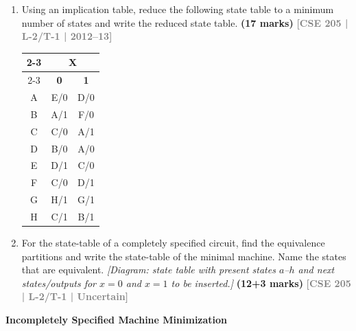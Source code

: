 \documentclass[12pt,a3paper]{article}
\newcommand{\yr}[1]{\hfill\textcolor{gray}{\small\textbf{[#1]}}}
\newcommand{\mk}[1]{\textcolor{orange!70!black}{\small\textbf{(#1 marks)}}}
\newcommand{\subtopic}[2]{%
  \vspace{10pt}
  \noindent\begin{tcolorbox}[colback=#1!8,colframe=#1,boxrule=0.6pt,arc=4pt,
    left=6pt,right=6pt,top=4pt,bottom=4pt]
    \small\bfseries\textcolor{#1}{#2}
  \end{tcolorbox}
  \vspace{2pt}
}
\begin{document}
\begin{enumerate}
\item Using an implication table, reduce the following state table to a minimum number of states and write the reduced state table.
\mk{17} \yr{CSE 205 | L-2/T-1 | 2012--13}

\begin{center}
  \begin{tabular}{|c|c|c|}
        \cline{2-3}
        \multicolumn{1}{c|}{} & \multicolumn{2}{c|}{\textbf{X}} \\
        \cline{2-3}
        \multicolumn{1}{c|}{} & \textbf{0} & \textbf{1} \\
        \hline
        A & E/0 & D/0 \\
        \hline
        B & A/1 & F/0 \\
        \hline
        C & C/0 & A/1 \\
        \hline
        D & B/0 & A/0 \\
        \hline
        E & D/1 & C/0 \\
        \hline
        F & C/0 & D/1 \\
        \hline
        G & H/1 & G/1 \\
        \hline
        H & C/1 & B/1 \\
        \hline
    \end{tabular}
\end{center}

\item For the state-table of a completely specified circuit, find the equivalence partitions and write the state-table of the minimal machine. Name the states that are equivalent.
\textit{[Diagram: state table with present states $a$--$h$ and next states/outputs for $x=0$ and $x=1$ to be inserted.]}
\mk{12+3} \yr{CSE 205 | L-2/T-1 | Uncertain}

\end{enumerate}

\subtopic{cF}{Incompletely Specified Machine Minimization}
\label{sub:s6-incomp}
\end{document}
